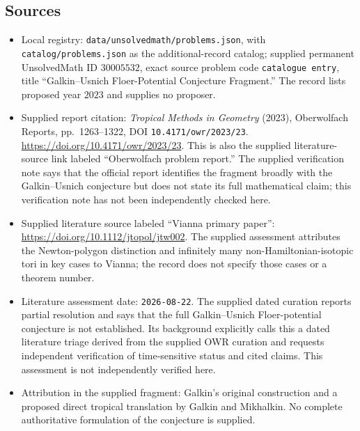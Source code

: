 \documentclass[11pt]{article}
\begin{document}
\subsection{Sources}
\begin{itemize}
\item Local registry: \texttt{data/unsolvedmath/problems.json}, with \texttt{catalog/problems.json} as the additional-record catalog; supplied permanent UnsolvedMath ID \(30005532\), exact source problem code \texttt{catalogue entry}, title ``Galkin--Usnich Floer-Potential Conjecture Fragment.'' The record lists proposed year \(2023\) and supplies no proposer.
\item Supplied report citation: \emph{Tropical Methods in Geometry} (2023), Oberwolfach Reports, pp.\ 1263--1322, DOI \texttt{10.4171/owr/2023/23}. \url{https://doi.org/10.4171/owr/2023/23}. This is also the supplied literature-source link labeled ``Oberwolfach problem report.'' The supplied verification note says that the official report identifies the fragment broadly with the Galkin--Usnich conjecture but does not state its full mathematical claim; this verification note has not been independently checked here.
\item Supplied literature source labeled ``Vianna primary paper'': \url{https://doi.org/10.1112/jtopol/jtw002}. The supplied assessment attributes the Newton-polygon distinction and infinitely many non-Hamiltonian-isotopic tori in key cases to Vianna; the record does not specify those cases or a theorem number.
\item Literature assessment date: \texttt{2026-08-22}. The supplied dated curation reports partial resolution and says that the full Galkin--Usnich Floer-potential conjecture is not established. Its background explicitly calls this a dated literature triage derived from the supplied OWR curation and requests independent verification of time-sensitive status and cited claims. This assessment is not independently verified here.
\item Attribution in the supplied fragment: Galkin's original construction and a proposed direct tropical translation by Galkin and Mikhalkin. No complete authoritative formulation of the conjecture is supplied.
\end{itemize}
\end{document}
